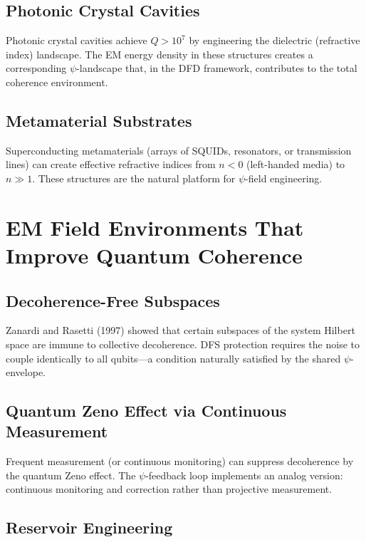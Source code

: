 \documentclass[11pt,letterpaper]{article}
\begin{document}
\subsection{Photonic Crystal Cavities}

Photonic crystal cavities achieve $Q > 10^7$ by engineering the
dielectric (refractive index) landscape. The EM energy density in these
structures creates a corresponding $\psi$-landscape that, in the DFD
framework, contributes to the total coherence environment.

\subsection{Metamaterial Substrates}

Superconducting metamaterials (arrays of SQUIDs, resonators, or
transmission lines) can create effective refractive indices from $n < 0$
(left-handed media) to $n \gg 1$. These structures are the natural
platform for $\psi$-field engineering.

\section{EM Field Environments That Improve Quantum Coherence}

\subsection{Decoherence-Free Subspaces}

Zanardi and Rasetti (1997) showed that certain subspaces of the
system Hilbert space are immune to collective decoherence. DFS protection
requires the noise to couple identically to all qubits---a condition
naturally satisfied by the shared $\psi$-envelope.

\subsection{Quantum Zeno Effect via Continuous Measurement}

Frequent measurement (or continuous monitoring) can suppress decoherence
by the quantum Zeno effect. The $\psi$-feedback loop implements an
analog version: continuous monitoring and correction rather than
projective measurement.

\subsection{Reservoir Engineering}
\end{document}
